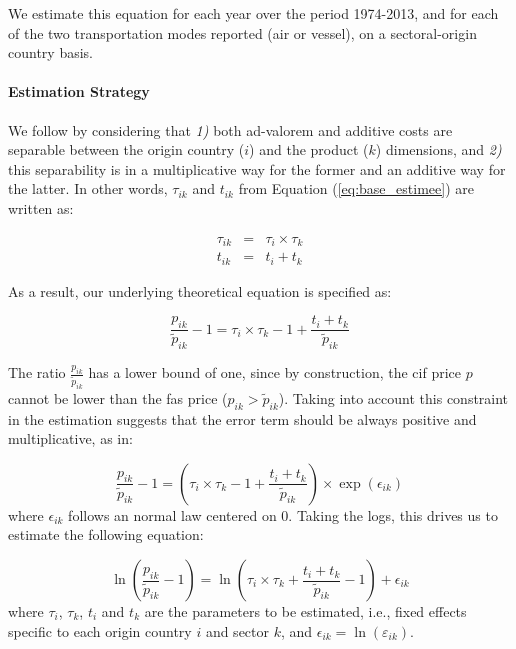 \documentclass[a4paper,11pt]{article}
\begin{document}
We estimate this equation for each year over the period 1974-2013, and for each of the two transportation modes reported (air or vessel), on a sectoral-origin country basis.

\paragraph{Estimation Strategy} We follow \citet{Irrazabal_2015} by considering that \textit{1)} both ad-valorem and additive costs are separable between the origin country ($i$) and the product ($k$) dimensions, and \textit{2)} this separability is in a multiplicative way for the former and an additive way for the latter. In other words, $\tau_{ik}$ and $t_{ik}$ from Equation (\ref{eq:base_estimee}) are written as:

\begin{eqnarray}
\tau_{ik} &=& \tau_{i} \times \tau_{k} \label{eq:ad-valorem}\\
t_{ik} &=& t_{i} + t_{k} \label{eq:add}
\end{eqnarray}

\noindent As a result, our underlying theoretical equation is specified as:

\begin{equation*}
\frac{p_{ik}}{\widetilde{p}_{ik}}-1 =\tau_{i} \times \tau_{k} -1 +\frac{t_{i} + t_{k}}{ \widetilde{p}_{ik}} \label{eq:theory_equation}
\end{equation*}

The ratio $\frac{p_{ik}}{\widetilde{p}_{ik}}$ has a lower bound of one, since by construction, the cif price $p$ cannot be lower than the fas price ($p_{ik}>\widetilde{p}_{ik}$). Taking into account this constraint in the estimation suggests that the error term should be always positive and multiplicative, as in:

\begin{equation*}
\frac{p_{ik}}{\widetilde{p}_{ik}}-1 =\left(\tau_{i} \times \tau_{k} -1+\frac{t_{i} + t_{k}}{\widetilde{p}_{ik}} \right)\times \exp(\epsilon_{ik})
\end{equation*}
\noindent where $\epsilon_{ik}$ follows an normal law centered on 0. Taking the logs, this drives us to estimate the following equation:

\begin{equation}
\ln\left(\frac{p_{ik}}{\widetilde{p}_{ik}}-1 \right)= \ln \left(\tau_{i} \times \tau_{k}+\frac{t_{i} + t_{k}}{\widetilde{p}_{ik}}-1 \right) + \epsilon_{ik} \label{eq:estimatedequation}
\end{equation}
where $\tau_{i}$, $\tau_{k}$, $t_{i}$ and $t_{k}$ are the parameters to be estimated, i.e., fixed effects specific to each origin country $i$ and sector $k$, and $\epsilon_{ik}= \ln(\varepsilon_{ik})$.
\end{document}

